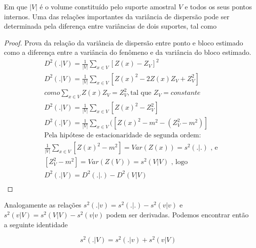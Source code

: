 Em que $|V|$ é o volume constituído pelo suporte amostral $V$ e todos os seus pontos internos. Uma das relações importantes da variância de dispersão pode ser determinada pela diferença entre variâncias de dois suportes, tal como
\begin{proof}
	Prova da relação da variância de dispersão entre ponto e bloco estimado como a diferença entre a variância do fenômeno e da variância do bloco estimado.
	\begin{align*}
	&D^{2}(.|V) = \frac{1}{|V|}\sum_{x \in V}[Z(x) - Z_{V}]^{2}  \\
	&D^{2}(.|V) = \frac{1}{|V|}\sum_{x \in V}[Z(x)^{2} - 2 Z(x)Z_{V} + Z_{V}^2] \\
	&como \sum_{x \in V} Z(x)Z_{V} = Z_{V}^2, \text{tal que } Z_{V} = constante\\
	&D^{2}(.|V) = \frac{1}{|V|}\sum_{x \in V}[Z(x)^{2} - Z_{V}^2]  \\
	&D^{2}(.|V) = \frac{1}{|V|}\sum_{x \in V}([Z(x)^{2} - m^{2} - (Z_{V}^2 - m^{2})] \\
	&\text{Pela hipótese de estacionaridade de segunda ordem:}  \\
	&\frac{1}{|V|}\sum_{x \in V}[Z(x)^{2} - m^{2}] = Var(Z(x)) = s^{2}(.|.)\text{ , e}\\
	&[Z_{V}^2 - m^{2}] = Var(Z(V)) = s^{2}(V|V)\text{ , logo}\\
	&D^{2}(.|V) = D^{2}(.|.) - D^{2}(V|V)  \\
	\end{align*}
\end{proof}

Analogamente as relações $s^{2}(.|v) = s^{2}(.|.) - s^{2}(v|v)$ e $s^{2}(v|V) = s^{2}(V|V) - s^{2}(v|v)$ podem ser derivadas. Podemos encontrar então a seguinte identidade 

\begin{equation}
s^{2}(.|V) = s^{2}(.|v) + s^{2}(v|V)
\end{equation}


